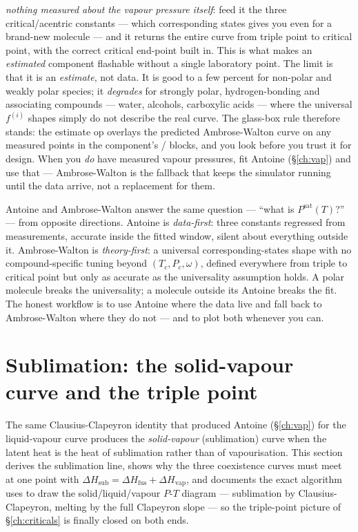 \documentclass[11pt,a4paper]{article}
\newcommand{\Psat}{P^{\mathrm{sat}}}
\newcommand{\Hvap}{\Delta H_{\!\mathrm{vap}}}
\newcommand{\Hsub}{\Delta H_{\!\mathrm{sub}}}
\newcommand{\Hfus}{\Delta H_{\!\mathrm{fus}}}
\begin{document}
\emph{nothing measured about the vapour pressure itself}: feed it the
three critical/acentric constants --- which corresponding states gives
you even for a brand-new molecule --- and it returns the entire curve
from triple point to critical point, with the correct critical
end-point built in.  This is what makes an \emph{estimated} component
flashable without a single laboratory point.  The limit is that it is
an \emph{estimate}, not data.  It is good to a few percent for
non-polar and weakly polar species; it \emph{degrades} for strongly
polar, hydrogen-bonding and associating compounds --- water, alcohols,
carboxylic acids --- where the universal $f^{(i)}$ shapes simply do
not describe the real curve.  The glass-box rule therefore stands:
the estimate op overlays the predicted Ambrose-Walton curve on any
measured points in the component's  /
 blocks, and you look before you trust it for
design.  When you \emph{do} have measured vapour pressures, fit
Antoine (\S\ref{ch:vap}) and use that --- Ambrose-Walton is the
fallback that keeps the simulator running until the data arrive, not a
replacement for them.

\begin{intuition}
Antoine and Ambrose-Walton answer the same question --- ``what is
$\Psat(T)$?'' --- from opposite directions.  Antoine is
\emph{data-first}: three constants regressed from measurements,
accurate inside the fitted window, silent about everything outside it.
Ambrose-Walton is \emph{theory-first}: a universal corresponding-states
shape with no compound-specific tuning beyond $(T_c, P_c, \omega)$,
defined everywhere from triple to critical point but only as accurate
as the universality assumption holds.  A polar molecule breaks the
universality; a molecule outside its Antoine  breaks the
fit.  The honest workflow is to use Antoine where the data live and
fall back to Ambrose-Walton where they do not --- and to plot both
whenever you can.
\end{intuition}

\section{Sublimation: the solid-vapour curve and the triple point}\label{ch:sublimation}

\begin{whatyoulllearn}
The same Clausius-Clapeyron identity that produced Antoine
(\S\ref{ch:vap}) for the liquid-vapour curve produces the
\emph{solid-vapour} (sublimation) curve when the latent heat is the
heat of sublimation rather than of vapourisation.  This section
derives the sublimation line, shows why the three coexistence curves
must meet at one point with $\Hsub = \Hfus + \Hvap$, and documents the
exact algorithm  uses to draw the
solid/liquid/vapour $P$-$T$ diagram --- sublimation by
Clausius-Clapeyron, melting by the full Clapeyron slope --- so the
triple-point picture of \S\ref{ch:criticals} is finally closed on
both ends.
\end{whatyoulllearn}
\end{document}

